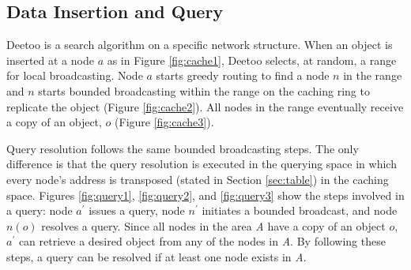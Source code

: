 \documentclass[conference]{IEEEtran}
\begin{document}
\subsection{Data Insertion and Query}\label{sec:cache}
Deetoo is a search algorithm on a specific network structure. When an object
is inserted at a node $a$ as in Figure \ref{fig:cache1}, 
Deetoo selects, at random, a range for local broadcasting.
Node $a$ starts greedy routing to find a node 
$n$ in the range and $n$ starts bounded broadcasting 
within the range on the caching ring to replicate the object
(Figure \ref{fig:cache2}). 
All nodes in the range 
eventually receive a copy of an object, $o$ (Figure \ref{fig:cache3}).

Query resolution follows the same bounded broadcasting steps. The only
difference is that the query resolution is executed in the querying
space in which every node's address is transposed (stated  
in Section \ref{sec:table}) in
the caching space. 
Figures
\ref{fig:query1}, \ref{fig:query2}, and \ref{fig:query3} show the
steps involved in a query: node $a^\prime$ issues a query, node $n^\prime$ initiates a 
bounded broadcast, and node $n(o)$ resolves a query. Since all nodes in the area
\textit{A} have a copy of an object $o$, $a^\prime$ can retrieve
a desired object from any of the nodes in \textit{A}. By following these
steps, a query can be resolved if at least one node exists in
\textit{A}.

\end{document}
